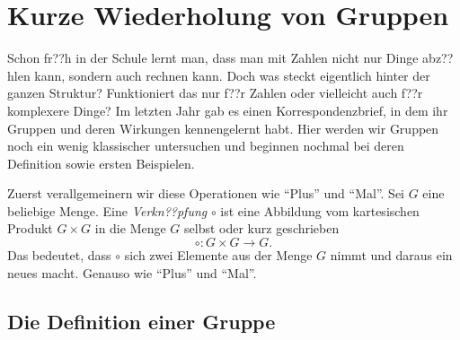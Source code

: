 \documentclass[a4paper,ngerman,12pt]{zirkelblatt1415}
\theoremstyle{definition}
\theoremstyle{plain}
\theoremstyle{remark}
\begin{document}




\tableofcontents


\section{Kurze Wiederholung von Gruppen}

Schon fr??h in der Schule lernt man, dass man mit Zahlen nicht nur Dinge abz??hlen kann, sondern auch rechnen kann. Doch was steckt eigentlich hinter der ganzen Struktur? Funktioniert das nur f??r Zahlen oder vielleicht auch f??r komplexere Dinge? Im letzten Jahr gab es einen Korrespondenzbrief, in dem ihr Gruppen und deren Wirkungen kennengelernt habt. Hier werden wir Gruppen noch ein wenig klassischer untersuchen und beginnen nochmal bei deren Definition sowie ersten Beispielen.

Zuerst verallgemeinern wir diese Operationen wie "`Plus"' und "`Mal"'. Sei $G$ eine beliebige Menge. Eine \textit{Verkn??pfung} $\circ$ ist eine Abbildung vom kartesischen Produkt $G\times G$ in die Menge $G$ selbst oder kurz geschrieben
\begin{equation*}
  \circ: G\times G \rightarrow G.
\end{equation*}
Das bedeutet, dass $\circ$ sich zwei Elemente aus der Menge $G$ nimmt und daraus ein neues macht. Genauso wie "`Plus"' und "`Mal"'.

\subsection{Die Definition einer Gruppe}
\end{document}
